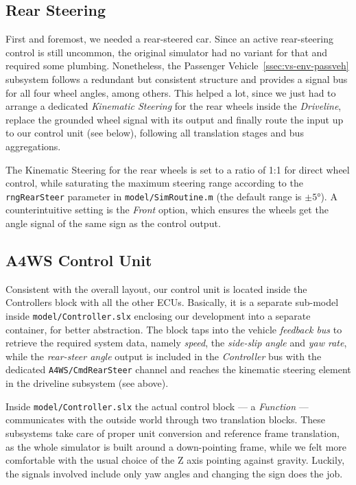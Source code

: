 		\subsection{Rear Steering}
		
		First and foremost, we needed a rear-steered car. Since an active rear-steering control is still uncommon, the original simulator had no variant for that and required some
		\mwSL{} plumbing. Nonetheless, the Passenger Vehicle~\ref{ssec:vs-env-passveh} subsystem follows a redundant but consistent structure and provides a signal bus
		for all four wheel angles, among others. This helped a lot, since we just had to arrange a dedicated \emph{Kinematic Steering} for the rear wheels inside the
		\emph{Driveline}, replace the grounded wheel signal with its output and finally route the input up to our control unit (see below), following all translation stages and bus
		aggregations.

		The Kinematic Steering for the rear wheels is set to a ratio of 1:1 for direct wheel control, while saturating the maximum steering range according to the
		\lstinline{rngRearSteer} parameter in \texttt{model/SimRoutine.m} (the default range is $\pm\ang{5}$). A counterintuitive setting is the \emph{Front} option,
		which ensures the wheels get the angle signal of the same sign as the control output.


		\subsection{A4WS Control Unit}
		\label{ssec:vs-int-ctrl}

		Consistent with the overall layout, our \emph{\awwwws} control unit is located inside the Controllers block with all the other ECUs.
		Basically, it is a separate \mwSL{} sub-model inside \texttt{model/Controller.slx} enclosing our development into a separate container, for better abstraction.
		The block taps into the vehicle \emph{feedback bus} to retrieve the required system data, namely \emph{speed}, the \emph{side-slip angle} and \emph{yaw rate},
		while the \emph{rear-steer angle} output is included in the \emph{Controller} bus with the dedicated \lstinline{A4WS/CmdRearSteer} channel and reaches the kinematic
		steering element in the driveline subsystem (see above).

		Inside \texttt{model/Controller.slx} the actual control block --- a \emph{\mwML{} Function} --- communicates with the outside world through two translation blocks.
		These subsystems take care of proper unit conversion and reference frame translation, as the whole simulator is built around a down-pointing frame, while we felt
		more comfortable with the usual choice of the Z axis pointing against gravity. Luckily, the signals involved include only yaw angles and changing the sign does the job.

